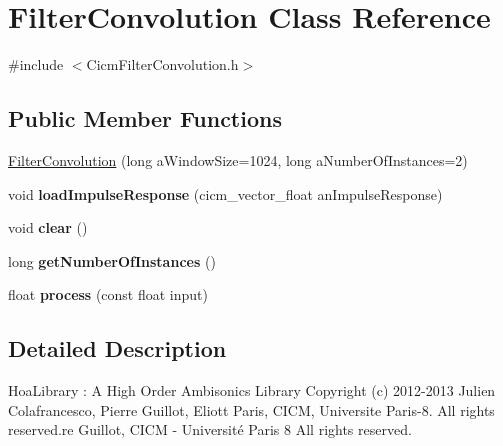 \hypertarget{class_filter_convolution}{\section{Filter\-Convolution Class Reference}
\label{class_filter_convolution}
}


{\ttfamily \#include $<$Cicm\-Filter\-Convolution.\-h$>$}

\subsection*{Public Member Functions}
\begin{DoxyCompactItemize}
\item 
\hyperlink{class_filter_convolution_a99521d63b9804c304e61f5be9378b3bf}{Filter\-Convolution} (long a\-Window\-Size=1024, long a\-Number\-Of\-Instances=2)
\item 
\hypertarget{class_filter_convolution_a9db8f05caa24a09767a6b3d69c7dda31}{void {\bfseries load\-Impulse\-Response} (cicm\-\_\-vector\-\_\-float an\-Impulse\-Response)}\label{class_filter_convolution_a9db8f05caa24a09767a6b3d69c7dda31}

\item 
\hypertarget{class_filter_convolution_acf2ce723d42a855a21c4397de82fb23f}{void {\bfseries clear} ()}\label{class_filter_convolution_acf2ce723d42a855a21c4397de82fb23f}

\item 
\hypertarget{class_filter_convolution_ab7ad079059769d24d3c085b438490346}{long {\bfseries get\-Number\-Of\-Instances} ()}\label{class_filter_convolution_ab7ad079059769d24d3c085b438490346}

\item 
\hypertarget{class_filter_convolution_abe951088f8edacfbd34bd97370f99ef3}{float {\bfseries process} (const float input)}\label{class_filter_convolution_abe951088f8edacfbd34bd97370f99ef3}

\end{DoxyCompactItemize}


\subsection{Detailed Description}
Hoa\-Library \-: A High Order Ambisonics Library Copyright (c) 2012-\/2013 Julien Colafrancesco, Pierre Guillot, Eliott Paris, C\-I\-C\-M, Universite Paris-\/8. All rights reserved.\-re Guillot, C\-I\-C\-M -\/ Université Paris 8 All rights reserved.

